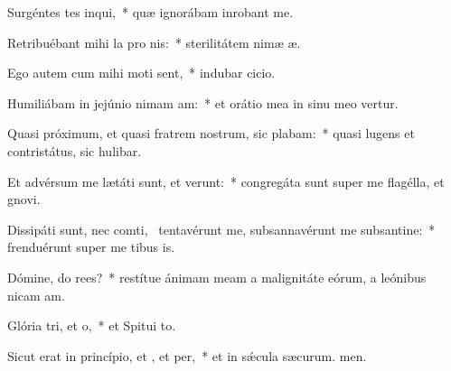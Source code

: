 \item Surgéntes tes inqui,~* quæ ignorábam inrobant me.
\item Retribuébant mihi la pro nis:~* sterilitátem nimæ æ.
\item Ego autem cum mihi moti sent,~* indubar cicio.
\item Humiliábam in jejúnio nimam am:~* et orátio mea in sinu meo vertur.
\item Quasi próximum, et quasi fratrem nostrum, sic plabam:~* quasi lugens et contristátus, sic hulibar.
\item Et advérsum me lætáti sunt, et verunt:~* congregáta sunt super me flagélla, et gnovi.
\item Dissipáti sunt, nec comti,~\pscross{} tentavérunt me, subsannavérunt me subsantine:~* frenduérunt super me tibus is.
\item Dómine, do rees?~* restítue ánimam meam a malignitáte eórum, a leónibus nicam am.
\item Glória tri, et o,~* et Spitui to.
\item Sicut erat in princípio, et , et per,~* et in sǽcula sæcurum. men.
